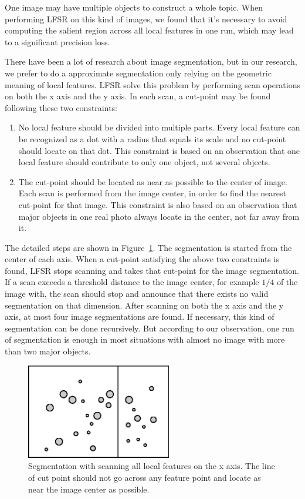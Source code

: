 One image may have multiple objects to construct a whole topic. When performing LFSR on this kind of images, we found that it's necessary to avoid computing the salient region across all local features in one run, which may lead to a significant precision loss.

There have been a lot of research about image segmentation, but in our research, we prefer to do a approximate segmentation only relying on the geometric meaning of local features. LFSR solve this problem by performing scan operations on both the x axis and the y axis. In each scan, a cut-point may be found following these two constraints:

\begin{enumerate}

  \item No local feature should be divided into multiple parts. Every local feature can be recognized as a dot with a radius that equals its scale and no cut-point should locate on that dot. This constraint is based on an observation that one local feature should contribute to only one object, not several objects.

  \item The cut-point should be located as near as possible to the center of image. Each scan is performed from the image center, in order to find the nearest cut-point for that image. This constraint is also based on an observation that major objects in one real photo always locate in the center, not far away from it.

\end{enumerate}

The detailed steps are shown in Figure~\ref{fig:segmentation}. The segmentation is started from the center of each axis. When a cut-point satisfying the above two constraints is found, LFSR stops scanning and takes that cut-point for the image segmentation. If a scan exceeds a threshold distance to the image center, for example $1/4$ of the image with, the scan should stop and announce that there exists no valid segmentation on that dimension. After scanning on both the x axis and the y axis, at most four image segmentations are found. If necessary, this kind of segmentation can be done recursively. But according to our observation, one run of segmentation is enough in most situations with almost no image with more than two major objects.

\begin{figure}
\centering
\label{fig:segmentation}
\includegraphics[width=2.5in]{images/fig-segmentation.eps}
\caption{Segmentation with scanning all local features on the x axis. The line of cut point should not go across any feature point and locate as near the image center as possible.}
\end{figure}

